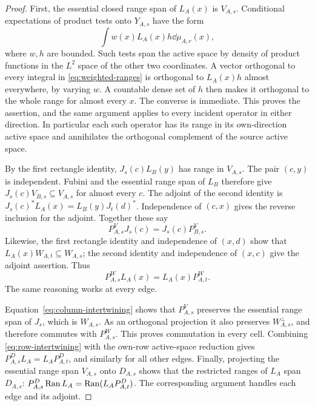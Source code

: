 \begin{proof}
First, the essential closed range span of $L_A(x)$ is $V_{A,s}$.
Conditional expectations of product tests onto $Y_{A,s}$ have the form
\begin{equation}\label{eq:weighted-ranges}
 \int w(x)L_A(x)h\dd\mu_{A,r}(x),
\end{equation}
where $w,h$ are bounded.  Such tests span the active space by density of
product functions in the $L^2$ space of the other two coordinates.
A vector orthogonal to every integral in \eqref{eq:weighted-ranges} is
orthogonal to $L_A(x)h$ almost everywhere, by varying $w$.  A countable
dense set of $h$ then makes it orthogonal to the whole range for almost
every $x$.  The converse is immediate.  This proves the assertion, and
the same argument applies to every incident operator in either direction.
In particular each such operator has its range in its own-direction
active space and annihilates the orthogonal complement of the source
active space.

By the first rectangle identity, $J_s(c)L_B(y)$ has range in $V_{A,s}$.
The pair $(c,y)$ is independent.  Fubini and the essential range span of
$L_B$ therefore give
$J_s(c)V_{B,s}\subseteq V_{A,s}$ for almost every $c$.
The adjoint of the second identity is
$J_s(c)^*L_A(x)=L_B(y)J_t(d)^*$.
Independence of $(c,x)$ gives the reverse inclusion for the adjoint.
Together these say
\begin{equation}\label{eq:column-intertwining}
 P^V_{A,s}J_s(c)=J_s(c)P^V_{B,s}.
\end{equation}
Likewise, the first rectangle identity and independence of $(x,d)$
show that $L_A(x)W_{A,t}\subseteq W_{A,s}$; the second identity and
independence of $(x,c)$ give the adjoint assertion.  Thus
\begin{equation}\label{eq:row-intertwining}
 P^W_{A,s}L_A(x)=L_A(x)P^W_{A,t}.
\end{equation}
The same reasoning works at every edge.

Equation~\eqref{eq:column-intertwining} shows that $P^V_{A,s}$ preserves
the essential range span of $J_s$, which is $W_{A,s}$.  As an orthogonal
projection it also preserves $W_{A,s}^{\perp}$, and therefore commutes
with $P^W_{A,s}$.  This proves commutation in every cell.  Combining
\eqref{eq:row-intertwining} with the own-row active-space reduction gives
$P^D_{A,s}L_A=L_AP^D_{A,t}$, and similarly for all other edges.
Finally, projecting the essential range span $V_{A,s}$ onto $D_{A,s}$
shows that the restricted ranges of $L_A$ span $D_{A,s}$:
$P^D_{A,s}\operatorname{Ran} L_A=\operatorname{Ran}(L_AP^D_{A,t})$.
The corresponding argument handles each edge and its adjoint.
\end{proof}

